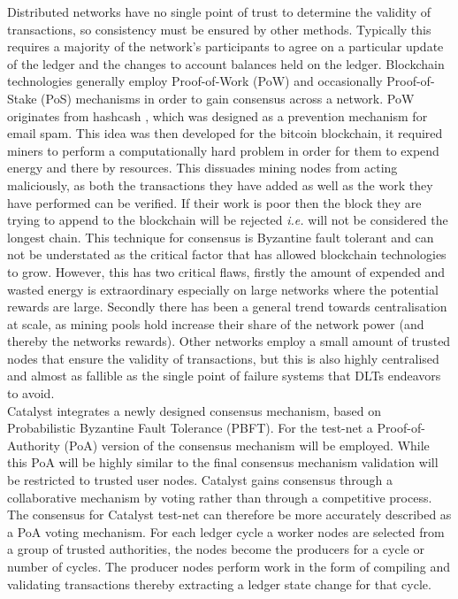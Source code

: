 Distributed networks have no single point of trust to determine the validity of transactions, so consistency must be ensured by other methods. Typically this requires a majority of the network's participants to agree on a particular update of the ledger and the changes to account balances held on the ledger. Blockchain technologies generally employ Proof-of-Work (PoW) and occasionally Proof-of-Stake (PoS) mechanisms in order to gain consensus across a network. PoW originates from hashcash \cite{back2002hashcash}, which was designed as a prevention mechanism for email spam. This idea was then developed for the bitcoin blockchain, it required miners to perform a computationally hard problem in order for them to expend energy and there by resources. This dissuades mining nodes from acting maliciously, as both the transactions they have added as well as the work they have performed can be verified. If their work is poor then the block they are trying to append to the blockchain will be rejected \textit{i.e.} will not be considered the longest chain. This technique for consensus is Byzantine fault tolerant and can not be understated as the critical factor that has allowed blockchain technologies to grow. However, this has two critical flaws, firstly the amount of expended and wasted energy is extraordinary especially on large networks where the potential rewards are large. Secondly there has been a general trend towards centralisation at scale, as mining pools hold increase their share of the network power (and thereby the networks rewards). Other networks employ a small amount of trusted nodes that ensure the validity of transactions, but this is also highly centralised and almost as fallible as the single point of failure systems that DLTs endeavors to avoid. \\


Catalyst integrates a newly designed consensus mechanism, based on Probabilistic Byzantine Fault Tolerance (PBFT). For the test-net a Proof-of-Authority (PoA) version of the consensus mechanism will be employed. While this PoA will be highly similar to the final consensus mechanism validation will be restricted to trusted user nodes. Catalyst gains consensus through a collaborative mechanism by voting rather than through a competitive process. The consensus for Catalyst test-net can therefore be more accurately described as a PoA voting mechanism. For each ledger cycle a worker nodes are selected from a group of trusted authorities, the nodes become the producers for a cycle or number of cycles. The producer nodes perform work in the form of compiling and validating transactions thereby extracting a ledger state change for that cycle. \\

